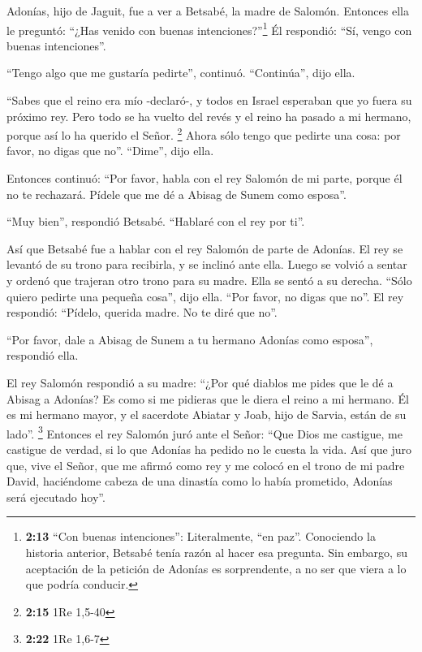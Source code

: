  Adonías, hijo de Jaguit, fue a ver a Betsabé, la madre
de Salomón. Entonces ella le preguntó: ``¿Has venido con buenas
intenciones?''\footnote{\textbf{2:13} ``Con buenas intenciones'':
  Literalmente, ``en paz''. Conociendo la historia anterior, Betsabé
  tenía razón al hacer esa pregunta. Sin embargo, su aceptación de la
  petición de Adonías es sorprendente, a no ser que viera a lo que
  podría conducir.} Él respondió: ``Sí, vengo con buenas intenciones''.

 ``Tengo algo que me gustaría pedirte'', continuó.
``Continúa'', dijo ella.

 ``Sabes que el reino era mío -declaró-, y todos en
Israel esperaban que yo fuera su próximo rey. Pero todo se ha vuelto del
revés y el reino ha pasado a mi hermano, porque así lo ha querido el
Señor. \footnote{\textbf{2:15} 1Re 1,5-40}  Ahora sólo
tengo que pedirte una cosa: por favor, no digas que no''. ``Dime'', dijo
ella.

 Entonces continuó: ``Por favor, habla con el rey Salomón
de mi parte, porque él no te rechazará. Pídele que me dé a Abisag de
Sunem como esposa''.

 ``Muy bien'', respondió Betsabé. ``Hablaré con el rey
por ti''.

 Así que Betsabé fue a hablar con el rey Salomón de parte
de Adonías. El rey se levantó de su trono para recibirla, y se inclinó
ante ella. Luego se volvió a sentar y ordenó que trajeran otro trono
para su madre. Ella se sentó a su derecha.  ``Sólo quiero
pedirte una pequeña cosa'', dijo ella. ``Por favor, no digas que no''.
El rey respondió: ``Pídelo, querida madre. No te diré que no''.

 ``Por favor, dale a Abisag de Sunem a tu hermano Adonías
como esposa'', respondió ella.

 El rey Salomón respondió a su madre: ``¿Por qué diablos
me pides que le dé a Abisag a Adonías? Es como si me pidieras que le
diera el reino a mi hermano. Él es mi hermano mayor, y el sacerdote
Abiatar y Joab, hijo de Sarvia, están de su lado''. \footnote{\textbf{2:22}
  1Re 1,6-7}  Entonces el rey Salomón juró ante el Señor:
``Que Dios me castigue, me castigue de verdad, si lo que Adonías ha
pedido no le cuesta la vida.  Así que juro que, vive el
Señor, que me afirmó como rey y me colocó en el trono de mi padre David,
haciéndome cabeza de una dinastía como lo había prometido, Adonías será
ejecutado hoy''.

